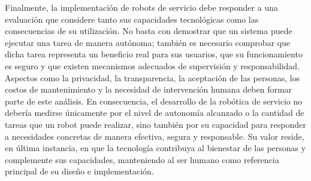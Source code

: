 \documentclass[11pt,a4paper]{article}
\begin{document}
Finalmente, la implementación de robots de servicio debe responder a una evaluación que considere tanto sus capacidades tecnológicas como las consecuencias de su utilización. No basta con demostrar que un sistema puede ejecutar una tarea de manera autónoma; también es necesario comprobar que dicha tarea representa un beneficio real para sus usuarios, que su funcionamiento es seguro y que existen mecanismos adecuados de supervisión y responsabilidad. Aspectos como la privacidad, la transparencia, la aceptación de las personas, los costos de mantenimiento y la necesidad de intervención humana deben formar parte de este análisis. En consecuencia, el desarrollo de la robótica de servicio no debería medirse únicamente por el nivel de autonomía alcanzado o la cantidad de tareas que un robot puede realizar, sino también por su capacidad para responder a necesidades concretas de manera efectiva, segura y responsable. Su valor reside, en última instancia, en que la tecnología contribuya al bienestar de las personas y complemente sus capacidades, manteniendo al ser humano como referencia principal de su diseño e implementación.
\end{document}
